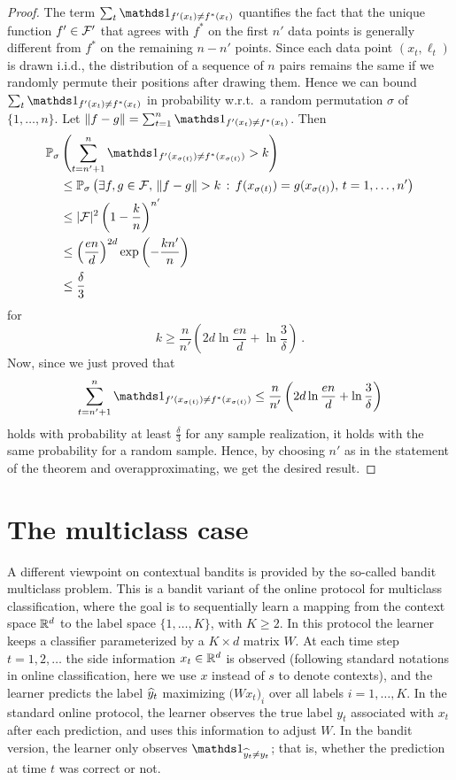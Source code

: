 \begin{proof}
The term $\sum_t \ds1_{f'(x_t) \neq f^*(x_t)}$ quantifies the fact that the unique function $f'\in\mathcal{F}'$ that agrees with $f^*$ on the first $n'$ data points is generally different from $f^*$ on the remaining $n-n'$ points. Since each data point $(x_t,\ell_t)$ is drawn i.i.d., the distribution of a sequence of $n$ pairs remains the same if we randomly permute their positions after drawing them. Hence we can bound
$
    \sum_t \ds1_{f'(x_t) \neq f^*(x_t)}
$
in probability w.r.t.\ a random permutation $\sigma$ of $\{1,\dots,n\}$. Let $\norm{f-g} = \sum_{t=1}^n \ds1_{f'(x_t) \neq f^*(x_t)}$. Then
\begin{align*}
    \P_\sigma&\left(\sum_{t=n'+1}^n \ds1_{f'(x_{\sigma(t)}) \neq f^*(x_{\sigma(t)})} > k\right)
\\ &\le
    \P_\sigma\left( \exists f,g \in \cF,\, \norm{f-g} > k \,:\,  f(x_{\sigma(t)})=g(x_{\sigma(t)}),\, t=1,\dots,n' \right)
\\ &\le
    |\cF|^2 \left(1-\frac{k}{n}\right)^{n'}
\\ &\le
    \left(\frac{en}{d}\right)^{2d} \exp\left(-\frac{kn'}{n}\right)
\\ &\le
    \frac{\delta}{3}
\end{align*}
for
\[
    k \ge \frac{n}{n'}\left(2d\ln\frac{en}{d} + \ln\frac{3}{\delta}\right)~.
\]
Now, since we just proved that
\[
    \sum_{t=n'+1}^n \ds1_{f'(x_{\sigma(t)}) \neq f^*(x_{\sigma(t)})}
\le
    \frac{n}{n'}\left(2d\ln\frac{en}{d} + \ln\frac{3}{\delta}\right)
\]
holds with probability at least $\tfrac{\delta}{3}$ for any sample realization, it holds with the same probability for a random sample. Hence, by choosing $n'$ as in the statement of the theorem and overapproximating, we get the desired result.
\end{proof}


\section{The multiclass case}
\label{s:multiclass}
%
A different viewpoint on contextual bandits is provided by the so-called bandit multiclass problem. This is a bandit variant of the online protocol for multiclass classification, where the goal is to sequentially learn a mapping from the context space $\mathbb{R}^d$ to the label space $\{1,\dots,K\}$, with $K \ge 2$. In this protocol the learner keeps a classifier parameterized by a $K \times d$ matrix $W$. At each time step $t=1,2,\dots$ the side information $x_t\in\mathbb{R}^d$ is observed (following standard notations in online classification, here we use $x$ instead of $s$ to denote contexts), and the learner predicts the label $\widehat{y}_t$ maximizing $\bigl(Wx_t\bigr)_i$ over all labels $i=1,\dots,K$. In the standard online protocol, the learner observes the true label $y_t$ associated with $x_t$ after each prediction, and uses this information to adjust $W$. In the bandit version, the learner only observes $\ds1_{\yhat_t \neq y_t}$; that is, whether the prediction at time $t$ was correct or not.


